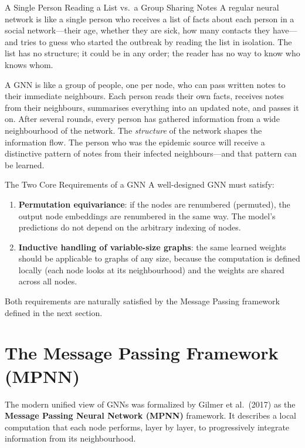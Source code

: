 \begin{analogybox}{A Single Person Reading a List vs.\ a Group Sharing Notes}
A regular neural network is like a single person who receives a list of facts about each person in a social network---their age, whether they are sick, how many contacts they have---and tries to guess who started the outbreak by reading the list in isolation. The list has no structure; it could be in any order; the reader has no way to know who knows whom.

A GNN is like a group of people, one per node, who can pass written notes to their immediate neighbours. Each person reads their own facts, receives notes from their neighbours, summarises everything into an updated note, and passes it on. After several rounds, every person has gathered information from a wide neighbourhood of the network. The \emph{structure} of the network shapes the information flow. The person who was the epidemic source will receive a distinctive pattern of notes from their infected neighbours---and that pattern can be learned.
\end{analogybox}

\begin{conceptbox}{The Two Core Requirements of a GNN}
A well-designed GNN must satisfy:
\begin{enumerate}[noitemsep]
    \item \textbf{Permutation equivariance}: if the nodes are renumbered (permuted), the output node embeddings are renumbered in the same way. The model's predictions do not depend on the arbitrary indexing of nodes.
    \item \textbf{Inductive handling of variable-size graphs}: the same learned weights should be applicable to graphs of any size, because the computation is defined locally (each node looks at its neighbourhood) and the weights are shared across all nodes.
\end{enumerate}
Both requirements are naturally satisfied by the Message Passing framework defined in the next section.
\end{conceptbox}

\section{The Message Passing Framework (MPNN)}

The modern unified view of GNNs was formalized by Gilmer et al.\ (2017) as the \textbf{Message Passing Neural Network (MPNN)} framework. It describes a local computation that each node performs, layer by layer, to progressively integrate information from its neighbourhood.

